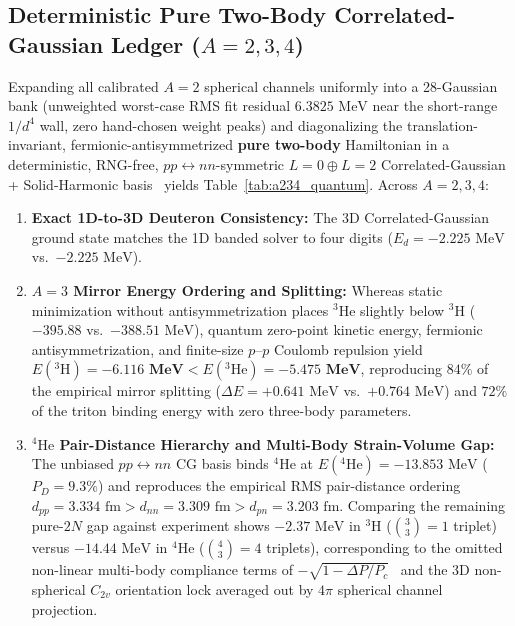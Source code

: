 \documentclass[11pt, a4paper]{article}
\begin{document}
\subsection{\texorpdfstring{Deterministic Pure Two-Body Correlated-Gaussian Ledger ($A = 2, 3, 4$)}{Deterministic Pure Two-Body Correlated-Gaussian Ledger (A = 2, 3, 4)}}
Expanding all calibrated $A = 2$ spherical channels uniformly into a 28-Gaussian bank (unweighted worst-case RMS fit residual $6.3825\text{ MeV}$ near the short-range $1/d^4$ wall, zero hand-chosen weight peaks) and diagonalizing the translation-invariant, fermionic-antisymmetrized \textbf{pure two-body} Hamiltonian in a deterministic, RNG-free, $pp \leftrightarrow nn$-symmetric $L = 0 \oplus L = 2$ Correlated-Gaussian + Solid-Harmonic basis~\cite{suzuki1998} yields Table~\ref{tab:a234_quantum}. Across $A = 2, 3, 4$:
\begin{enumerate}[leftmargin=1.8em, itemsep=2pt]
    \item \textbf{Exact 1D-to-3D Deuteron Consistency:} The 3D Correlated-Gaussian ground state matches the 1D banded solver to four digits ($E_d = -2.225\text{ MeV}$ vs.\ $-2.225\text{ MeV}$).
    \item \textbf{$A = 3$ Mirror Energy Ordering and Splitting:} Whereas static minimization without antisymmetrization places $^3\text{He}$ slightly below $^3\text{H}$ ($-395.88$ vs.\ $-388.51\text{ MeV}$), quantum zero-point kinetic energy, fermionic antisymmetrization, and finite-size $p\text{--}p$ Coulomb repulsion yield $E(^3\text{H}) = \mathbf{-6.116\text{ MeV}} < E(^3\text{He}) = \mathbf{-5.475\text{ MeV}}$, reproducing $84\%$ of the empirical mirror splitting ($\Delta E = +0.641\text{ MeV}$ vs.\ $+0.764\text{ MeV}$) and $72\%$ of the triton binding energy with zero three-body parameters.
    \item \textbf{$^4\text{He}$ Pair-Distance Hierarchy and Multi-Body Strain-Volume Gap:} The unbiased $pp \leftrightarrow nn$ CG basis binds $^4\text{He}$ at $E(^4\text{He}) = -13.853\text{ MeV}$ ($P_D = 9.3\%$) and reproduces the empirical RMS pair-distance ordering $d_{pp} = 3.334\text{ fm} > d_{nn} = 3.309\text{ fm} > d_{pn} = 3.203\text{ fm}$. Comparing the remaining pure-$2N$ gap against experiment shows $-2.37\text{ MeV}$ in $^3\text{H}$ ($\binom{3}{3} = 1$ triplet) versus $-14.44\text{ MeV}$ in $^4\text{He}$ ($\binom{4}{3} = 4$ triplets), corresponding to the omitted non-linear multi-body compliance terms of $-\sqrt{1 - \Delta P/P_c}$~\cite{bairmosheh2026} and the 3D non-spherical $C_{2v}$ orientation lock averaged out by $4\pi$ spherical channel projection.
\end{enumerate}
\end{document}
